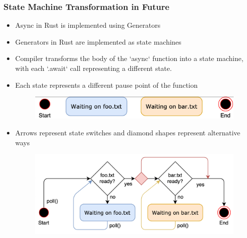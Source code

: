\begin{frame}[fragile]
    \frametitle{State Machine Transformation in Future}
% 
% 
    \begin{itemize}
        \item Async in Rust is implemented using {\color{red}Generators}
        \item Generators in Rust are implemented as {\color{red}state machines}
        \item {\color{red}Compiler} transforms the body of the `async` function into a state machine, with each `.await` call representing a different state. \pause
        \item {\color{red}Each state} represents a different pause point of the function
% 
    \begin{figure}
    \includegraphics[width=0.4\linewidth]{figs/async-state-machine-states.png}
    \end{figure} \pause
% 
        \item Arrows represent {\color{red}state switches} and diamond shapes represent alternative ways
% 
    \begin{figure}
    \includegraphics[width=0.55\linewidth]{figs/async-state-machine-basic.png}
    \end{figure}
    \end{itemize}
% 
\end{frame}
